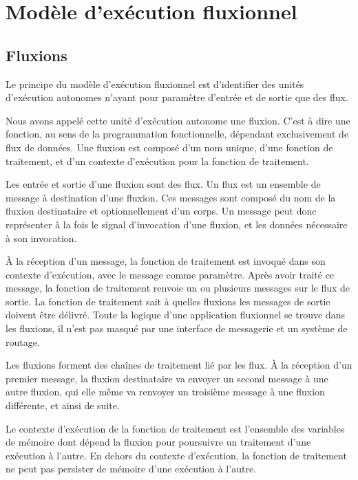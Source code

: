 \section{Modèle d'exécution fluxionnel}

\subsection{Fluxions}

Le principe du modèle d'exécution fluxionnel est d'identifier des unités d'exécution autonomes n'ayant pour paramètre d'entrée et de sortie que des flux.

Nous avons appelé cette unité d'exécution autonome une fluxion.
C'est à dire une fonction, au sens de la programmation fonctionnelle, dépendant exclusivement de flux de données.
Une fluxion est composé d'un nom unique, d'une fonction de traitement, et d'un contexte d'exécution pour la fonction de traitement.

Les entrée et sortie d'une fluxion sont des flux.
Un flux est un ensemble de message à destination d'une fluxion.
Ces messages sont composé du nom de la fluxion destinataire et optionnellement d'un corps.
Un message peut donc représenter à la fois le signal d'invocation d'une fluxion, et les données nécessaire à son invocation.

À la réception d'un message, la fonction de traitement est invoqué dans son contexte d'exécution, avec le message comme paramètre.
Après avoir traité ce message, la fonction de traitement renvoie un ou plusieurs messages sur le flux de sortie.
La fonction de traitement sait à quelles fluxions les messages de sortie doivent être délivré.
Toute la logique d'une application fluxionnel se trouve dans les fluxions, il n'est pas masqué par une interface de messagerie et un système de routage.

Les fluxions forment des chaînes de traitement lié par les flux.
À la réception d'un premier message, la fluxion destinataire va envoyer un second message à une autre fluxion, qui elle même va renvoyer un troisième message à une fluxion différente, et ainsi de suite.

Le contexte d'exécution de la fonction de traitement est l'ensemble des variables de mémoire dont dépend la fluxion pour poursuivre un traitement d'une exécution à l'autre.
En dehors du contexte d'exécution, la fonction de traitement ne peut pas persister de mémoire d'une exécution à l'autre.


